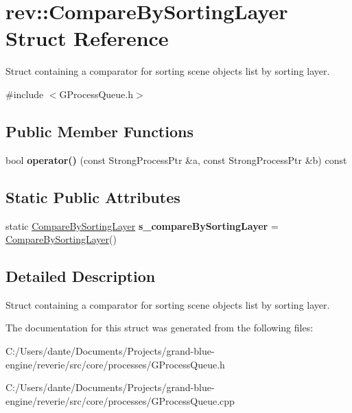 \hypertarget{structrev_1_1_compare_by_sorting_layer}{}\section{rev\+::Compare\+By\+Sorting\+Layer Struct Reference}
\label{structrev_1_1_compare_by_sorting_layer}


Struct containing a comparator for sorting scene objects list by sorting layer.  




{\ttfamily \#include $<$G\+Process\+Queue.\+h$>$}

\subsection*{Public Member Functions}
\begin{DoxyCompactItemize}
\item 
\mbox{\label{structrev_1_1_compare_by_sorting_layer_a78c33affd36a4155a99a3d3b13b0732e}} 
bool {\bfseries operator()} (const Strong\+Process\+Ptr \&a, const Strong\+Process\+Ptr \&b) const
\end{DoxyCompactItemize}
\subsection*{Static Public Attributes}
\begin{DoxyCompactItemize}
\item 
\mbox{\label{structrev_1_1_compare_by_sorting_layer_a4608f24a9165d012f7193bc5782682a0}} 
static \mbox{\hyperlink{structrev_1_1_compare_by_sorting_layer}{Compare\+By\+Sorting\+Layer}} {\bfseries s\+\_\+compare\+By\+Sorting\+Layer} = \mbox{\hyperlink{structrev_1_1_compare_by_sorting_layer}{Compare\+By\+Sorting\+Layer}}()
\end{DoxyCompactItemize}


\subsection{Detailed Description}
Struct containing a comparator for sorting scene objects list by sorting layer. 

The documentation for this struct was generated from the following files\+:\begin{DoxyCompactItemize}
\item 
C\+:/\+Users/dante/\+Documents/\+Projects/grand-\/blue-\/engine/reverie/src/core/processes/G\+Process\+Queue.\+h\item 
C\+:/\+Users/dante/\+Documents/\+Projects/grand-\/blue-\/engine/reverie/src/core/processes/G\+Process\+Queue.\+cpp\end{DoxyCompactItemize}
